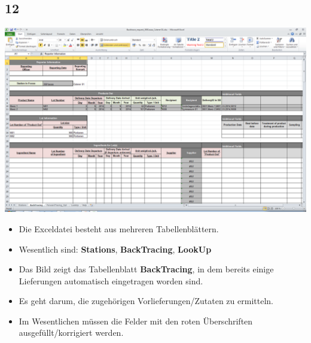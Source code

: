 \documentclass{beamer}
\begin{document}
\subsection{12}
\begin{frame}
	\begin{center}
  		\includegraphics[height=0.5\textheight]{12.png}
	\end{center}
	\begin{itemize}
		\item Die Exceldatei besteht aus mehreren Tabellenblättern.
		\item Wesentlich sind: \textbf{Stations}, \textbf{BackTracing}, \textbf{LookUp}
		\item Das Bild zeigt das Tabellenblatt \textbf{BackTracing}, in dem bereits einige Lieferungen automatisch eingetragen worden sind.
		\item Es geht darum, die zugehörigen Vorlieferungen/Zutaten zu ermitteln.
		\item Im Wesentlichen müssen die Felder mit den roten Überschriften ausgefüllt/korrigiert werden.
	\end{itemize}
\end{frame}
\end{document}
